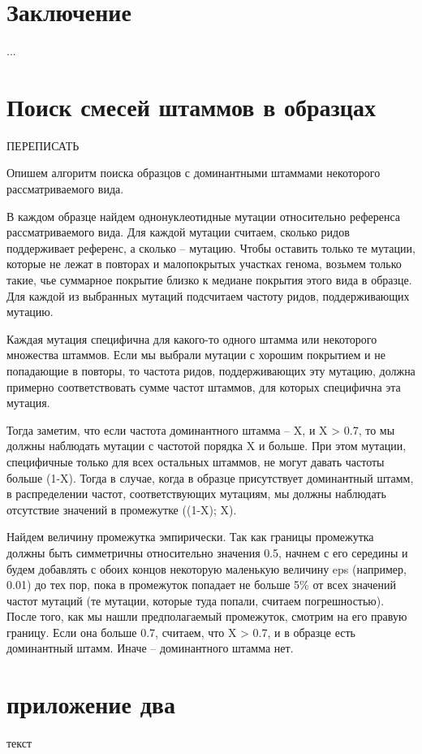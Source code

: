 \documentclass{spbau-diploma}
\begin{document}
\section*{Заключение}
...









\begin{appendices}

\section{Поиск смесей штаммов в образцах}\label{dominated_samples}

ПЕРЕПИСАТЬ

Опишем алгоритм поиска образцов с доминантными штаммами некоторого рассматриваемого вида.

В каждом образце найдем однонуклеотидные мутации относительно референса рассматриваемого вида. Для каждой мутации считаем, сколько ридов поддерживает референс, а сколько – мутацию. Чтобы оставить только те мутации, которые не лежат в повторах и малопокрытых участках генома, возьмем только такие, чье суммарное покрытие близко к медиане покрытия этого вида в образце. Для каждой из выбранных мутаций подсчитаем частоту ридов, поддерживающих мутацию.

Каждая мутация специфична для какого-то одного штамма или некоторого множества штаммов. Если мы выбрали мутации с хорошим покрытием и не попадающие в повторы, то частота ридов, поддерживающих эту мутацию, должна примерно соответствовать сумме частот штаммов, для которых специфична эта мутация.

Тогда заметим, что если частота доминантного штамма – X, и X > 0.7, то мы должны наблюдать мутации с частотой порядка X и больше. При этом мутации, специфичные только для всех остальных штаммов, не могут давать частоты больше (1-X). Тогда в случае, когда в образце присутствует доминантный штамм, в распределении частот, соответствующих мутациям, мы должны наблюдать отсутствие значений в промежутке ((1-X); X).

Найдем величину промежутка эмпирически. Так как границы промежутка должны быть симметричны относительно значения 0.5, начнем с его середины и будем добавлять с обоих концов некоторую маленькую величину eps (например, 0.01) до тех пор, пока в промежуток попадает не больше 5\% от всех значений частот мутаций (те мутации, которые туда попали, считаем погрешностью). После того, как мы нашли предполагаемый промежуток, смотрим на его правую границу. Если она больше 0.7, считаем, что X > 0.7, и в образце есть доминантный штамм. Иначе – доминантного штамма нет.


\section{приложение два}
текст

\end{appendices}
\end{document}
